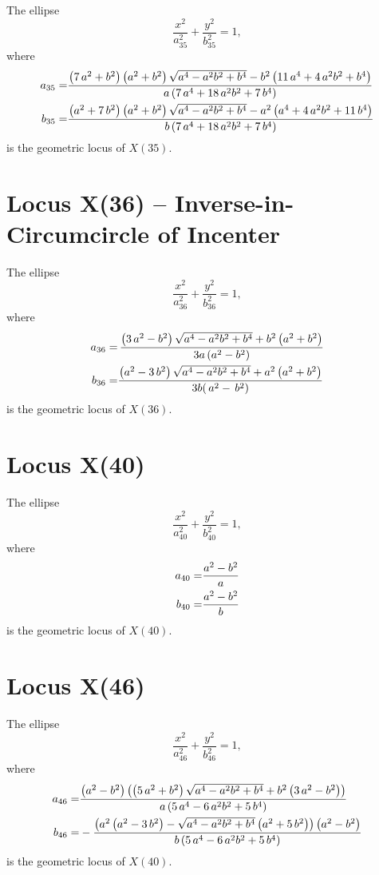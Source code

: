 \documentclass[11pt]{amsart}
\theoremstyle{plain}
\theoremstyle{definition}
\begin{document}
The ellipse \[ \frac{x^2}{a_{35}^2}+\frac{y^2}{b_{35}^2}=1, \]
where
\[\aligned 
a_{35}=&     {\frac { \left( 7\,{a}^{2}+{b}^{2} \right)  \left( {a}^{2}+{b}^{2}
		\right) \sqrt {{a}^{4}-{a}^{2}{b}^{2}+{b}^{4}}-{b}^{2} \left( 11\,{a}
		^{4}+4\,{a}^{2}{b}^{2}+{b}^{4} \right) }{a \left( 7\,{a}^{4}+18\,{a}^{
			2}{b}^{2}+7\,{b}^{4} \right) }}
%
\\
b_{35}=&  {\frac { \left( {a}^{2}+7\,{b}^{2} \right)  \left( {a}^{2}+{b}^{2}
		\right) \sqrt {{a}^{4}-{a}^{2}{b}^{2}+{b}^{4}}-{a}^{2} \left( {a}^{4}
		+4\,{a}^{2}{b}^{2}+11\,{b}^{4} \right) }{b \left( 7\,{a}^{4}+18\,{a}^{
			2}{b}^{2}+7\,{b}^{4} \right) }}
%
%
\endaligned\] 
is the geometric locus of $X(35)$.

     \section{Locus X(36) -- Inverse-in-Circumcircle of Incenter }

The ellipse \[ \frac{x^2}{a_{36}^2}+\frac{y^2}{b_{36}^2}=1, \]
where
\[\aligned 
a_{36}=&    \,{\frac { \left( 3\,{a}^{2}-{b}^{2} \right) \sqrt {{a}^{4}-{a}^{2}
			{b}^{2}+{b}^{4}}+{b}^{2} \left( {a}^{2}+{b}^{2} \right) }{3a \left( a^2-b^2
		\right)    }}
%
\\
b_{36}=&   {\frac { \left( {a}^{2}-3\,{b}^{2} \right) \sqrt {{a}^{4}-{a}^{2}{b}^{
				2}+{b}^{4}}+{a}^{2} \left( {a}^{2}+{b}^{2} \right) }{3b(  \,{a}^{2} - \,{b
		}^{2})}}
%
\endaligned\] 
is the geometric locus of $X(36)$.





      \section{Locus X(40)}

The ellipse \[ \frac{x^2}{a_{40}^2}+\frac{y^2}{b_{40}^2}=1, \]
where
\[\aligned 
a_{40}=&    \frac { a^2-b^2}{a  }
\\
b_{40}=&  \frac { a^2-b^2}{b  }
%
\endaligned\] 
is the geometric locus of $X(40)$.
      
      
       \section{Locus X(46)}
      
      The ellipse \[ \frac{x^2}{a_{46}^2}+\frac{y^2}{b_{46}^2}=1, \]
      where
      \[\aligned 
      a_{46}=&          
     {\frac { \left( {a}^{2}-{b}^{2} \right)  \left(  \left( 5\,{a}^{2}+{b}
     		^{2} \right) \sqrt {{a}^{4}-{a}^{2}{b}^{2}+{b}^{4}}+{b}^{2} \left( 3\,
     		{a}^{2}-{b}^{2} \right)  \right) }{a \left( 5\,{a}^{4}-6\,{a}^{2}{b}^{
     			2}+5\,{b}^{4} \right) }}
      \\
      b_{46}=&  -{\frac { \left( {a}^{2} \left( {a}^{2}-3\,{b}^{2} \right) -\sqrt {{a}
      			^{4}-{a}^{2}{b}^{2}+{b}^{4}} \left( {a}^{2}+5\,{b}^{2} \right) 
      		\right)  \left( {a}^{2}-{b}^{2} \right) }{b \left( 5\,{a}^{4}-6\,{a}^
      		{2}{b}^{2}+5\,{b}^{4} \right) }}
      \endaligned\] 
      is the geometric locus of $X(40)$.
\end{document}
